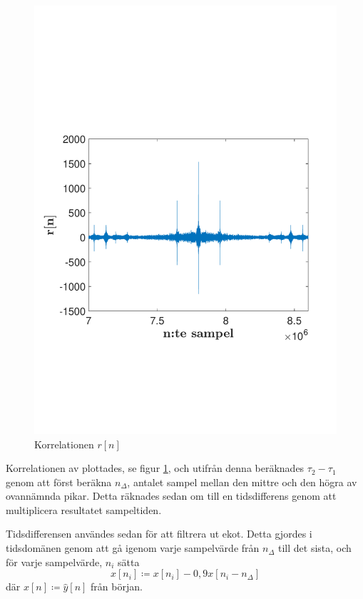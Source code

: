 \documentclass[10pt,twocolumn]{article}
\begin{document}
\begin{figure}
    \includegraphics[width=\linewidth]{fig1}
    \caption{
        Korrelationen $r[n]$ 
        \label{fig:z}
    }
\end{figure}

Korrelationen av \yhat  plottades, se figur \ref{fig:z}, och utifrån denna beräknades $\tau_2 - \tau_1$ genom att först beräkna $n_\Delta$, antalet sampel mellan
den mittre och den högra av ovannämnda pikar. Detta räknades sedan om till en tidsdifferens genom att multiplicera resultatet
sampeltiden.

Tidsdifferensen användes sedan för att filtrera ut ekot. Detta gjordes i tidsdomänen genom att gå igenom varje sampelvärde
från $n_\Delta$ till det sista, och för varje sampelvärde, $n_i$ sätta 
\begin{equation}
x[n_i] \coloneqq x[n_i] - 0,9x[n_i - n_\Delta] 
\label{e4}
\end{equation}
där $x[n] \coloneqq \hat{y}[n]$ från början.
\end{document}
